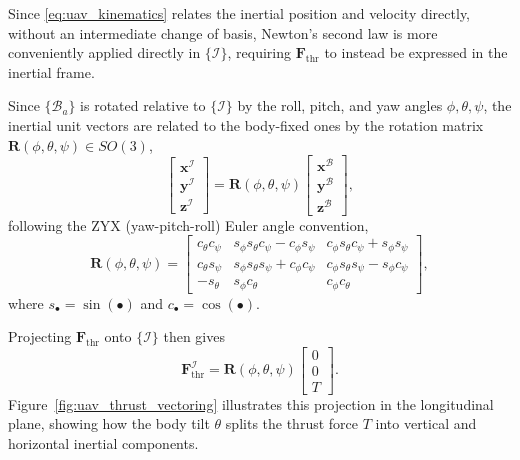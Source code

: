 Since \eqref{eq:uav_kinematics} relates the inertial position and velocity directly, without an intermediate change of basis, Newton's second law is more conveniently applied directly in $\{\mathcal{I}\}$, requiring $\mathbf{F}_{\mathrm{thr}}$ to instead be expressed in the inertial frame. 

Since $\{\mathcal{B}_a\}$ is rotated relative to $\{\mathcal{I}\}$ by the roll, pitch, and yaw angles $\phi, \theta, \psi$, the inertial unit vectors are related to the body-fixed ones by the rotation matrix $\mathbf{R}(\phi,\theta,\psi) \in SO(3)$,
\begin{equation}
    \begin{bmatrix} \mathbf{x}^{\mathcal{I}} \\ \mathbf{y}^{\mathcal{I}} \\ \mathbf{z}^{\mathcal{I}} \end{bmatrix} = \mathbf{R}(\phi,\theta,\psi) \begin{bmatrix} \mathbf{x}^{\mathcal{B}} \\ \mathbf{y}^{\mathcal{B}} \\ \mathbf{z}^{\mathcal{B}} \end{bmatrix},
    \label{eq:uav_basis_change}
\end{equation}
following the ZYX (yaw-pitch-roll) Euler angle convention,
\begin{equation}
    \mathbf{R}(\phi,\theta,\psi) =
    \begin{bmatrix}
        c_\theta c_\psi & s_\phi s_\theta c_\psi - c_\phi s_\psi & c_\phi s_\theta c_\psi + s_\phi s_\psi \\
        c_\theta s_\psi & s_\phi s_\theta s_\psi + c_\phi c_\psi & c_\phi s_\theta s_\psi - s_\phi c_\psi \\
        -s_\theta & s_\phi c_\theta & c_\phi c_\theta
    \end{bmatrix},
    \label{eq:uav_rotation_matrix}
\end{equation}
where $s_\bullet = \sin(\bullet)$ and $c_\bullet = \cos(\bullet)$. 

Projecting $\mathbf{F}_{\mathrm{thr}}$ onto $\{\mathcal{I}\}$ then gives
\begin{equation}
    \mathbf{F}_{\mathrm{thr}}^{\mathcal{I}} = \mathbf{R}(\phi,\theta,\psi)\begin{bmatrix} 0 \\ 0 \\ T \end{bmatrix}.
    \label{eq:uav_thrust_inertial}
\end{equation}
Figure~\ref{fig:uav_thrust_vectoring} illustrates this projection in the longitudinal plane, showing how the body tilt $\theta$ splits the thrust force $T$ into vertical and horizontal inertial components.

